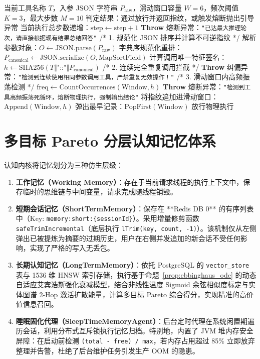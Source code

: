 \begin{algorithm}[htbp]
\caption{基于规范化参数哈希的 ReAct 振荡熔断检测算法}
\label{alg:react_cycle_guard}
\begin{algorithmic}[1]
\Require 当前工具名称 $T$，入参 JSON 字符串 $P_{\text{raw}}$，滑动窗口容量 $W=6$，频次阈值 $K=3$，最大步数 $M=10$
\Ensure 判定结果：通过放行并返回指纹，或触发熔断抛出引导异常
\State 当前执行总步数递增：$\text{step} \leftarrow \text{step} + 1$
    \State \textbf{Throw} 熔断异常：\texttt{"已达最大推理轮次，请直接根据现有结果总结回答"}
\EndIf
\State /* 1. 规范化 JSON 排序并计算不可逆指纹 */
\State 解析参数对象：$O \leftarrow \text{JSON.parse}(P_{\text{raw}})$
\State 字典序规范化重排：$P_{\text{canonical}} \leftarrow \text{JSON.serialize}(O, \text{MapSortField})$
\State 计算调用唯一特征签名：$h \leftarrow \text{SHA256}(T \mathbin{\Vert} \text{"::"} \mathbin{\Vert} P_{\text{canonical}})$
\State /* 2. 连续完全重复调用拦截 */
    \State \textbf{Throw} 纠偏异常：\texttt{"检测到连续使用相同参数调用工具，严禁重复无效操作！"}
\EndIf
\State /* 3. 滑动窗口内高频振荡检测 */
\State $\text{freq} \leftarrow \text{CountOccurrences}(\text{Window}, h)$
    \State \textbf{Throw} 熔断异常：\texttt{"检测到工具高频振荡死循环，熔断物理执行，强制输出结论"}
\EndIf
\State 将指纹追加进滑动窗口：$\text{Append}(\text{Window}, h)$
    \State 弹出最早记录：$\text{PopFirst}(\text{Window})$
\EndIf
\State \Return 放行物理执行
\end{algorithmic}
\end{algorithm}

\section{多目标 Pareto 分层认知记忆体系}

认知内核将记忆划分为三种仿生层级：
\begin{enumerate}
    \item \textbf{工作记忆（Working Memory）}：存在于当前请求线程的执行上下文中，保存临时的思维链与中间变量，请求完成随线程销毁。
    \item \textbf{短期会话记忆（ShortTermMemory）}：保存在 **Redis DB 0** 的有序列表中（Key: \texttt{memory:short:\{sessionId\}}）。采用增量修剪函数 \texttt{safeTrimIncremental}（底层执行 \texttt{lTrim(key, count, -1)}）。该机制仅从左侧弹出已被提炼为摘要的过期历史，用户在右侧并发追加的新会话不受任何影响，实现了严格的写入无丢包。
    \item \textbf{长期认知记忆（LongTermMemory）}：依托 PostgreSQL 的 \texttt{vector\_store} 表与 1536 维 HNSW 索引存储，执行基于命题~\ref{prop:ebbinghaus_ode} 的动态自适应艾宾浩斯强化衰减模型，结合非线性温度 Sigmoid 余弦相似度标定与实体图谱 2-Hop 激活扩散能量，计算多目标 Pareto 综合得分，实现精准的高价值信息召回。
    \item \textbf{睡眠固化代理（SleepTimeMemoryAgent）}：后台定时代理在系统闲置期遍历会话，利用分布式互斥锁执行记忆归档。特别地，内置了 JVM 堆内存安全屏障：在启动前检测 \texttt{(total - free) / max}，若内存占用超过 85\% 立即放弃整理并告警，杜绝了后台维护任务引发生产 OOM 的隐患。
\end{enumerate}

